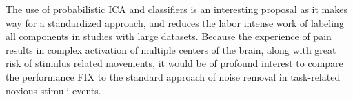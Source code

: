 The use of probabilistic ICA and classifiers is an interesting proposal as it makes way for a standardized approach, and reduces the labor intense work of labeling all components in studies with large datasets. Because the experience of pain results in complex activation of multiple centers of the brain, along with great risk of stimulus related movements, it would be of profound interest to compare the performance FIX to the standard approach of noise removal in task-related noxious stimuli events.     
